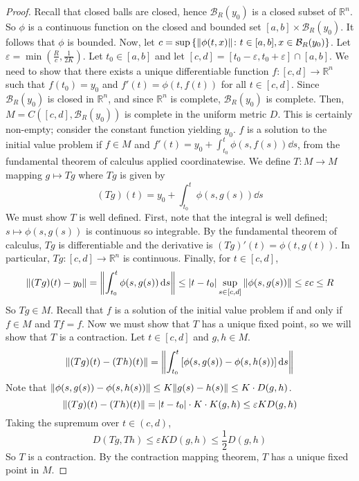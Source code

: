\begin{proof}
	Recall that closed balls are closed, hence \( \mathcal B_R(y_0) \) is a closed subset of \( \mathbb R^n \).
	So \( \phi \) is a continuous function on the closed and bounded set \( [a,b] \times \mathcal B_R(y_0) \).
	It follows that \( \phi \) is bounded.
	Now, let \( c = \sup \qty{ \norm{\phi(t,x)} \colon t \in [a,b], x \in \mathcal B_R(y_0) } \).
	Let \( \varepsilon = \min(\frac{R}{c}, \frac{1}{2K}) \).
	Let \( t_0 \in [a,b] \) and let \( [c,d] = [t_0 - \varepsilon, t_0 + \varepsilon] \cap [a,b] \).
	We need to show that there exists a unique differentiable function \( f \colon [c,d] \to \mathbb R^n \) such that \( f(t_0) = y_0 \) and \( f'(t) = \phi(t,f(t)) \) for all \( t \in [c,d] \).
	Since \( \mathcal B_R(y_0) \) is closed in \( \mathbb R^n \), and since \( \mathbb R^n \) is complete, \( \mathcal B_R(y_0) \) is complete.
	Then, \( M = C([c,d], \mathcal B_R(y_0)) \) is complete in the uniform metric \( D \).
	This is certainly non-empty; consider the constant function yielding \( y_0 \).
	\( f \) is a solution to the initial value problem if \( f \in M \) and \( f'(t) = y_0 + \int_{t_0}^t \phi(s, f(s)) \dd{s} \), from the fundamental theorem of calculus applied coordinatewise.
	We define \( T \colon M \to M \) mapping \( g \mapsto Tg \) where \( Tg \) is given by
	\[
		(Tg)(t) = y_0 + \int_{t_0}^t \phi(s, g(s)) \dd{s}
	\]
	We must show \( T \) is well defined.
	First, note that the integral is well defined; \( s \mapsto \phi(s,g(s)) \) is continuous so integrable.
	By the fundamental theorem of calculus, \( Tg \) is differentiable and the derivative is \( (Tg)'(t) = \phi(t,g(t)) \).
	In particular, \( Tg \colon [c,d] \to \mathbb R^n \) is continuous.
	Finally, for \( t \in [c,d] \),
	\[
		\norm{(Tg)(t) - y_0} = \norm{\int_{t_0}^t \phi(s, g(s)) \dd{s}} \leq \abs{t - t_0} \sup_{s \in [c,d]} \norm{\phi(s,g(s))} \leq \varepsilon c \leq R
	\]
	So \( Tg \in M \).
	Recall that \( f \) is a solution of the initial value problem if and only if \( f \in M \) and \( Tf = f \).
	Now we must show that \( T \) has a unique fixed point, so we will show that \( T \) is a contraction.
	Let \( t \in [c,d] \) and \( g,h \in M \).
	\[
		\norm{(Tg)(t) - (Th)(t)} = \norm{\int_{t_0}^t \qty[ \phi(s,g(s)) - \phi(s,h(s)) ] \dd{s}}
	\]
	Note that \( \norm{\phi(s,g(s)) - \phi(s,h(s))} \leq K \norm{g(s) - h(s)} \leq K \cdot D(g,h) \).
	\[
		\norm{(Tg)(t) - (Th)(t)} = \abs{t-t_0} \cdot K \cdot K(g,h) \leq \varepsilon K D(g,h)
	\]
	Taking the supremum over \( t \in (c,d) \),
	\[
		D(Tg, Th) \leq \varepsilon K D(g,h) \leq \frac{1}{2} D(g,h)
	\]
	So \( T \) is a contraction.
	By the contraction mapping theorem, \( T \) has a unique fixed point in \( M \).
\end{proof}
